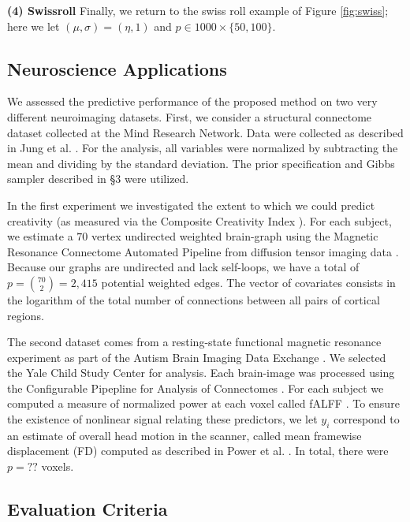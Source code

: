 \textbf{(4) Swissroll} 
% 
Finally, we return to the swiss roll example of Figure \ref{fig:swiss}; here we let $(\mu,\sigma)=(\eta,1)$ and   $p \in 1000 \times \{50, 100\}$.



\subsection{Neuroscience Applications}

We assessed the predictive performance of the proposed method on two very different neuroimaging datasets. First, we consider a structural connectome dataset collected at the Mind Research Network.  Data were collected as described in Jung et al. \cite{Jung2010}. For the analysis, all variables were normalized by subtracting the mean and dividing by the standard deviation. The  prior specification and Gibbs sampler described in \S 3 were utilized. 

In the first experiment we investigated the extent to which we could predict creativity (as measured via the Composite Creativity Index \cite{Arden2010}).   For each subject, we estimate a $70$ vertex undirected weighted brain-graph using the Magnetic Resonance Connectome Automated Pipeline \cite{MRCAP11} from diffusion tensor imaging data \cite{Mori2006}. Because our graphs are undirected and lack self-loops, we have a total of $p=\binom{70}{2}=2,415$ potential weighted edges. The vector of covariates consists in the logarithm of the total number of connections between all pairs of cortical regions. 

The second dataset comes from a resting-state functional magnetic resonance experiment as part of the Autism Brain Imaging Data Exchange \cite{Autism}.  We selected the Yale Child Study Center for analysis.  Each brain-image was processed using the Configurable Pipepline for Analysis of Connectomes \cite{cpac}. For each subject we computed a measure of normalized power at each voxel called fALFF \cite{Zou2008}.  To ensure the existence of nonlinear signal relating these predictors, we let $y_i$ correspond to an estimate of overall head motion in the scanner, called mean framewise displacement (FD) computed as described in Power et al. \cite{power}. In total, there were $p=??$ voxels.

\subsection{Evaluation Criteria}

